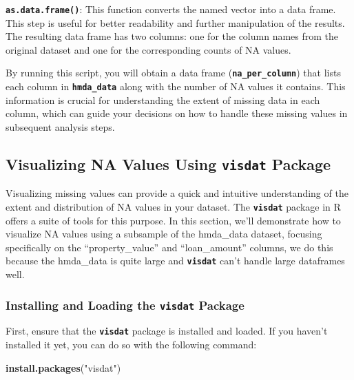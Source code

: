 \documentclass[
]{book}
\newenvironment{Shaded}{\begin{snugshade}}{\end{snugshade}}
\newcommand{\FunctionTok}[1]{\textcolor[rgb]{0.13,0.29,0.53}{\textbf{#1}}}
\newcommand{\NormalTok}[1]{#1}
\newcommand{\StringTok}[1]{\textcolor[rgb]{0.31,0.60,0.02}{#1}}
\begin{document}
\textbf{\texttt{as.data.frame()}}: This function converts the named vector into a data frame. This step is useful for better readability and further manipulation of the results. The resulting data frame has two columns: one for the column names from the original dataset and one for the corresponding counts of NA values.

By running this script, you will obtain a data frame (\textbf{\texttt{na\_per\_column}}) that lists each column in \textbf{\texttt{hmda\_data}} along with the number of NA values it contains. This information is crucial for understanding the extent of missing data in each column, which can guide your decisions on how to handle these missing values in subsequent analysis steps.

\hypertarget{visualizing-na-values-using-visdat-package}{%
\subsection{\texorpdfstring{Visualizing NA Values Using \texttt{visdat} Package}{Visualizing NA Values Using visdat Package}}\label{visualizing-na-values-using-visdat-package}}

Visualizing missing values can provide a quick and intuitive understanding of the extent and distribution of NA values in your dataset. The \textbf{\texttt{visdat}} package in R offers a suite of tools for this purpose. In this section, we'll demonstrate how to visualize NA values using a subsample of the hmda\_data dataset, focusing specifically on the ``property\_value'' and ``loan\_amount'' columns, we do this because the hmda\_data is quite large and \textbf{\texttt{visdat}} can't handle large dataframes well.

\hypertarget{installing-and-loading-the-visdat-package}{%
\subsubsection*{\texorpdfstring{Installing and Loading the \texttt{visdat} Package}{Installing and Loading the visdat Package}}\label{installing-and-loading-the-visdat-package}}

First, ensure that the \textbf{\texttt{visdat}} package is installed and loaded. If you haven't installed it yet, you can do so with the following command:

\begin{Shaded}
\begin{Highlighting}[]
\FunctionTok{install.packages}\NormalTok{(}\StringTok{"visdat"}\NormalTok{)}
\end{Highlighting}
\end{Shaded}
\end{document}
